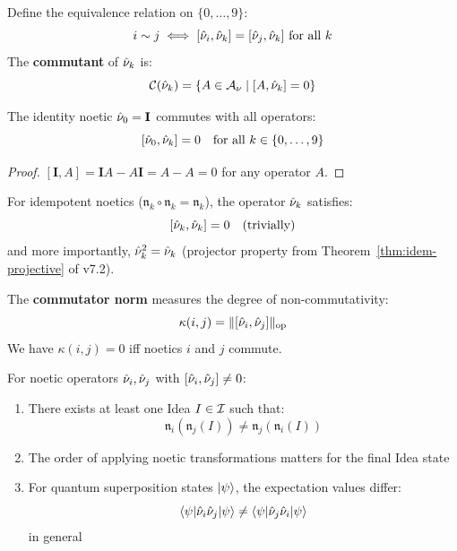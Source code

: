 \begin{definition}
\label{def:commuting-classes}
Define the equivalence relation on $\{0,\ldots,9\}$:
\[
i \sim j \iff [\hat{\nu}_i, \hat{\nu}_k] = [\hat{\nu}_j, \hat{\nu}_k] \text{ for all } k
\]
The \textbf{commutant} of $\hat{\nu}_k$ is:
\[
\mathcal{C}(\hat{\nu}_k) = \{A \in \mathcal{A}_\nu \mid [A, \hat{\nu}_k] = 0\}
\]
\end{definition}

\begin{theorem}
\label{thm:identity-commutes}
The identity noetic $\hat{\nu}_0 = \mathbf{I}$ commutes with all operators:
\[
[\hat{\nu}_0, \hat{\nu}_k] = 0 \quad \text{for all } k \in \{0,\ldots,9\}
\]
\end{theorem}

\begin{proof}
$[\mathbf{I}, A] = \mathbf{I} A - A \mathbf{I} = A - A = 0$ for any operator $A$.
\end{proof}

\begin{proposition}
\label{prop:idem-self-commute}
For idempotent noetics ($\mathfrak{n}_k \circ \mathfrak{n}_k = \mathfrak{n}_k$), the operator $\hat{\nu}_k$ satisfies:
\[
[\hat{\nu}_k, \hat{\nu}_k] = 0 \quad \text{(trivially)}
\]
and more importantly, $\hat{\nu}_k^2 = \hat{\nu}_k$ (projector property from Theorem~\ref{thm:idem-projective} of v7.2).
\end{proposition}

\begin{definition}
\label{def:commutator-norm}
The \textbf{commutator norm} measures the degree of non-commutativity:
\[
\kappa(i,j) = \|[\hat{\nu}_i, \hat{\nu}_j]\|_{\mathrm{op}}
\]
We have $\kappa(i,j) = 0$ iff noetics $i$ and $j$ commute.
\end{definition}

\begin{theorem}
\label{thm:noncomm-semantic}
For noetic operators $\hat{\nu}_i, \hat{\nu}_j$ with $[\hat{\nu}_i, \hat{\nu}_j] \neq 0$:
\begin{enumerate}
  \item There exists at least one Idea $I \in \mathcal{I}$ such that:
  \[
  \mathfrak{n}_i(\mathfrak{n}_j(I)) \neq \mathfrak{n}_j(\mathfrak{n}_i(I))
  \]
  \item The order of applying noetic transformations matters for the final Idea state
  \item For quantum superposition states $|\psi\rangle$, the expectation values differ:
  \[
  \langle \psi|\hat{\nu}_i \hat{\nu}_j|\psi\rangle \neq \langle \psi|\hat{\nu}_j \hat{\nu}_i|\psi\rangle
  \]
  in general
\end{enumerate}
\end{theorem}

